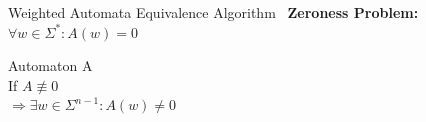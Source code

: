 \documentclass[rgb, pdf]{beamer}
\begin{document}
    \begin{frame}{Weighted Automata Equivalence Algorithm~\autocite{Kiefer2013OnTC}}
    \textbf{Zeroness Problem: $\forall w \in \Sigma^* : A(w) = 0$} \vspace{0.2cm}\\ 
     \begin{minipage}[t][.28\textheight][t]{.19\textwidth}
        \begin{small}
        Automaton A \vspace{0.2cm} \\
         If $A \not\equiv 0$ \vspace{0.3cm}\\
        $ \Rightarrow \exists w \in \Sigma^{n-1}: A(w) \neq 0$
        \begin{center}
          \autocite{tzeng1992polynomial}
         \end{center}        
        \end{small}        
     \end{minipage}\hfill%
     \begin{minipage}[t][.28\textheight][t]{.26\textwidth}
        

\end{minipage}
\end{frame}
\end{document}
